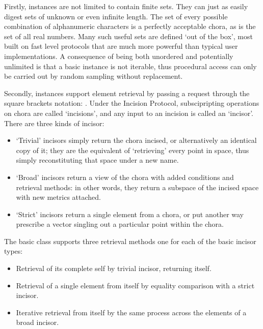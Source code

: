 \documentclass[letterpaper,10pt,english]{jupyterBook}
\begin{document}
\sphinxAtStartPar
Firstly, instances  are not limited to contain finite sets. They can just as easily digest sets of unknown or even infinite length. The set of every possible combination of alphanumeric characters is a perfectly acceptable chora, as is the set of all real numbers. Many such useful sets are defined ‘out of the box’, most built on fast  level protocols that are much more powerful than typical user implementations. A consequence of being both unordered and potentially unlimited is that a basic  instance is not iterable, thus procedural access can only be carried out by random sampling without replacement.

\sphinxAtStartPar
Secondly,  instances support element retrieval by passing a request through the square brackets notation: . Under the Incision Protocol, subscipripting operations on chora are called ‘incisions’, and any input to an incision is called an ‘incisor’. There are three kinds of incisor:
\begin{itemize}
\item {} 
\sphinxAtStartPar
‘Trivial’ incisors simply return the chora incised, or alternatively an identical copy of it; they are the equivalent of ‘retrieving’ every point in space, thus simply reconstituting that space under a new name.

\item {} 
\sphinxAtStartPar
‘Broad’ incisors return a view of the chora with added conditions and retrieval methods: in other words, they return a subspace of the incised space with new metrics attached.

\item {} 
\sphinxAtStartPar
‘Strict’ incisors return a single element from a chora, or \sphinxhyphen{} put another way \sphinxhyphen{} prescribe a vector singling out a particular point within the chora.

\end{itemize}

\sphinxAtStartPar
The basic  class supports three retrieval methods \sphinxhyphen{} one for each of the basic incisor types:
\begin{itemize}
\item {} 
\sphinxAtStartPar
Retrieval of its complete self by trivial incisor, returning itself.

\item {} 
\sphinxAtStartPar
Retrieval of a single element from itself by equality comparison with a strict incisor.

\item {} 
\sphinxAtStartPar
Iterative retrieval from itself by the same process across the elements of a broad incisor.

\end{itemize}
\end{document}
